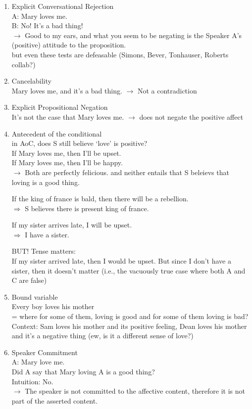 \documentclass[12pt,letterpaper,table,svgnames,dvipsnames]{article}
\begin{document}
\begin{enumerate}
    \item Explicit Conversational Rejection\\
    A: Mary loves me.\\
    B: No! It's a bad thing!\\
    $\rightarrow$ Good to my ears, and what you seem to be negating is the Speaker A's (positive) attitude to the proposition.\\
    but even these tests are defeasable (Simons, Bever, Tonhauser, Roberts collab?)

    \item Cancelability\\
    Mary loves me, and it's a bad thing.
    $\rightarrow$ Not a contradiction

    \item Explicit Propositional Negation\\
    It's not the case that Mary loves me.
    $\rightarrow$ does not negate the positive affect


    \item Antecedent of the conditional\\
    in AoC, does S still believe `love' is positive?\\
    If Mary loves me, then I'll be upset.\\
    If Mary loves me, then I'll be happy.\\
    $\rightarrow$ Both are perfectly felicious. and neither entails that S beleievs that loving is a good thing.


    If the king of france is bald, then there will be a rebellion.\\
    $\Rightarrow$ S believes there is present king of france.

    If my sister arrives late, I will be upset.\\
    $\Rightarrow$ I have a sister.


    BUT! Tense matters:\\
    If my sister arrived late, then I would be upset. But since I don't have a sister, then it doesn't matter (i.e., the vacuously true case where both A and C are false)


    \item Bound variable\\
    Every boy loves his mother\\
    = where for some of them, loving is good and for some of them loving is bad?\\
    Context: Sam loves his mother and its positive feeling, Dean loves his mother and it's a negative thing (ew, is it a different sense of love?)


    \item Speaker Commitment\\
    A: Mary love me.\\
    Did A say that Mary loving A is a good thing?\\
    Intuition: No.\\
    $\rightarrow$ The speaker is not committed to the affective content, therefore it is not part of the asserted content.





\end{enumerate}
\end{document}
